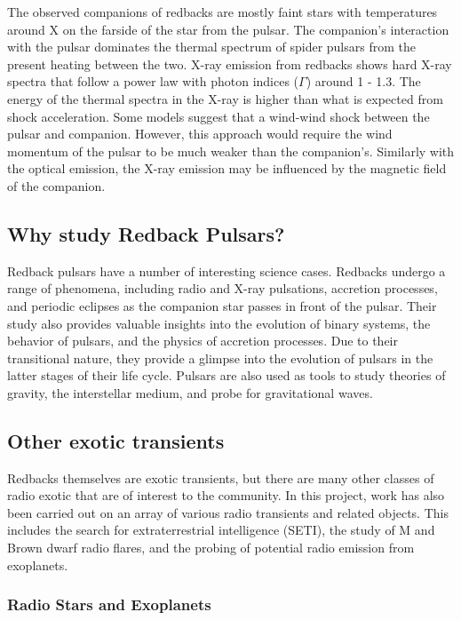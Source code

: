 The observed companions of redbacks are mostly faint stars with temperatures around X on the farside of the star from the pulsar. The companion's interaction with the pulsar dominates the thermal spectrum of spider pulsars from the present heating between the two. X-ray emission from redbacks shows hard X-ray spectra that follow a power law with photon indices ($\Gamma$) around 1 - 1.3. The energy of the thermal spectra in the X-ray is higher than what is expected from shock acceleration. Some models suggest that a wind-wind shock between the pulsar and companion. However, this approach would require the wind momentum of the pulsar to be much weaker than the companion's. Similarly with the optical emission, the X-ray emission may be influenced by the magnetic field of the companion.

\subsection{Why study Redback Pulsars?}

Redback pulsars have a number of interesting science cases. Redbacks undergo a range of phenomena, including radio and X-ray pulsations, accretion processes, and periodic eclipses as the companion star passes in front of the pulsar. Their study also provides valuable insights into the evolution of binary systems, the behavior of pulsars, and the physics of accretion processes. Due to their transitional nature, they provide a glimpse into the evolution of pulsars in the latter stages of their life cycle. Pulsars are also used as tools to study theories of gravity, the interstellar medium, and probe for gravitational waves.

\subsection{Other exotic transients}

Redbacks themselves are exotic transients, but there are many other classes of radio exotic that are of interest to the community. In this project, work has also been carried out on an array of various radio transients and related objects. This includes the search for extraterrestrial intelligence (SETI), the study of M and Brown dwarf radio flares, and the probing of potential radio emission from exoplanets.

\subsubsection{Radio Stars and Exoplanets}

